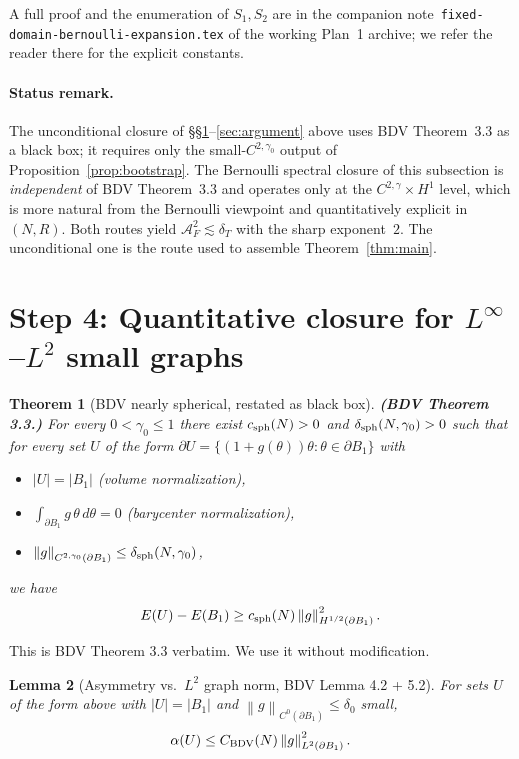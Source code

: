 \documentclass[11pt]{amsart}
\newtheorem{theorem}{Theorem}[section]
\newtheorem{lemma}[theorem]{Lemma}
\theoremstyle{definition}
\newcommand{\dT}{\delta_T}
\newcommand{\AF}{\mathcal A_F}
\newcommand{\norm}[1]{\left\|#1\right\|}
\newcommand{\abs}[1]{\left|#1\right|}
\renewcommand{\d}{\,d}
\begin{document}
A full proof and the enumeration of $S_1,S_2$ are in the companion
note~\texttt{fixed-domain-bernoulli-expansion.tex} of the working
Plan~1 archive; we refer the reader there for the explicit constants.

\paragraph{Status remark.}
The unconditional closure of \S\S\ref{sec:step4-Gn}--\ref{sec:argument}
above uses BDV Theorem~3.3 as a black box; it requires only the
small-$C^{2,\gamma_0}$ output of Proposition~\ref{prop:bootstrap}.
The Bernoulli spectral closure of this subsection is \emph{independent}
of BDV Theorem~3.3 and operates only at the $C^{2,\gamma}\times H^1$
level, which is more natural from the Bernoulli viewpoint and
quantitatively explicit in $(N,R)$.  Both routes yield
$\AF^{2}\lesssim\dT$ with the sharp exponent~$2$.  The unconditional
one is the route used to assemble Theorem~\ref{thm:main}.

\section{Step 4: Quantitative closure for $L^\infty$--$L^2$ small graphs}\label{sec:step4-Gn}

\begin{theorem}[BDV nearly spherical, restated as black box]\label{thm:nearlysph}
\textbf{(BDV Theorem 3.3.)} For every $0<\gamma_0\le1$ there exist
$c_{\rm sph}(N)>0$ and $\delta_{\rm sph}(N,\gamma_0)>0$ such that for every set $U$ of the form
$\partial U=\{(1+g(\theta))\theta:\theta\in\partial B_1\}$ with
\begin{itemize}
\item $\abs U=\abs{B_1}$ (volume normalization),
\item $\int_{\partial B_1}g\,\theta\d\theta=0$ (barycenter normalization),
\item $\norm{g}_{C^{2,\gamma_0}(\partial B_1)}\le\delta_{\rm sph}(N,\gamma_0)$,
\end{itemize}
we have
\[
E(U)-E(B_1)\ge c_{\rm sph}(N)\norm{g}_{H^{1/2}(\partial B_1)}^2.
\]
\end{theorem}

This is BDV Theorem 3.3 verbatim. We use it without modification.

\begin{lemma}[Asymmetry vs.\ $L^2$ graph norm, BDV Lemma 4.2 + 5.2]\label{lem:asymL2}
For sets $U$ of the form above with $\abs U=\abs{B_1}$ and
$\norm{g}_{C^0(\partial B_1)}\le\delta_0$ small,
\[
\alpha(U)\le C_{\rm BDV}(N)\norm{g}_{L^2(\partial B_1)}^2.
\]
\end{lemma}
\end{document}
